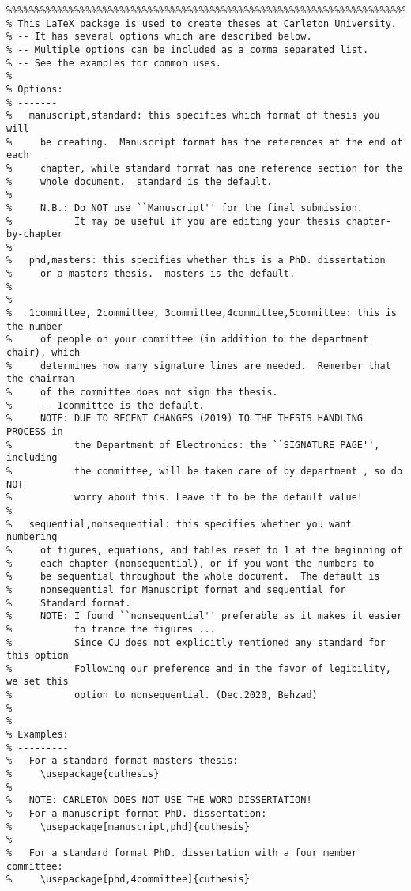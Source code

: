 \documentclass{article}
\begin{document}
\begin{verbatim}
%%%%%%%%%%%%%%%%%%%%%%%%%%%%%%%%%%%%%%%%%%%%%%%%%%%%%%%%%%%%%%%%%%%%%%%%%%%%%%%%
% This LaTeX package is used to create theses at Carleton University. 
% -- It has several options which are described below.  
% -- Multiple options can be included as a comma separated list.  
% -- See the examples for common uses.
%
% Options: 
% -------
%   manuscript,standard: this specifies which format of thesis you will
%     be creating.  Manuscript format has the references at the end of each
%     chapter, while standard format has one reference section for the
%     whole document.  standard is the default.
%     
%     N.B.: Do NOT use ``Manuscript'' for the final submission.
%           It may be useful if you are editing your thesis chapter-by-chapter
%   
%   phd,masters: this specifies whether this is a PhD. dissertation
%     or a masters thesis.  masters is the default.
%
%
%   1committee, 2committee, 3committee,4committee,5committee: this is the number
%     of people on your committee (in addition to the department chair), which 
%     determines how many signature lines are needed.  Remember that the chairman 
%     of the committee does not sign the thesis.  
%     -- 1committee is the default.
%     NOTE: DUE TO RECENT CHANGES (2019) TO THE THESIS HANDLING PROCESS in 
%           the Department of Electronics: the ``SIGNATURE PAGE'', including 
%           the committee, will be taken care of by department , so do NOT 
%           worry about this. Leave it to be the default value!
%
%   sequential,nonsequential: this specifies whether you want numbering
%     of figures, equations, and tables reset to 1 at the beginning of
%     each chapter (nonsequential), or if you want the numbers to
%     be sequential throughout the whole document.  The default is
%     nonsequential for Manuscript format and sequential for
%     Standard format.
%     NOTE: I found ``nonsequential'' preferable as it makes it easier 
%           to trance the figures ...
%           Since CU does not explicitly mentioned any standard for this option 
%           Following our preference and in the favor of legibility, we set this 
%           option to nonsequential. (Dec.2020, Behzad)
%
%
% Examples:
% ---------
%   For a standard format masters thesis:
%     \usepackage{cuthesis}
%   
%   NOTE: CARLETON DOES NOT USE THE WORD DISSERTATION!
%   For a manuscript format PhD. dissertation:
%     \usepackage[manuscript,phd]{cuthesis}
%
%   For a standard format PhD. dissertation with a four member committee:
%     \usepackage[phd,4committee]{cuthesis}

\end{verbatim}
\end{document}
